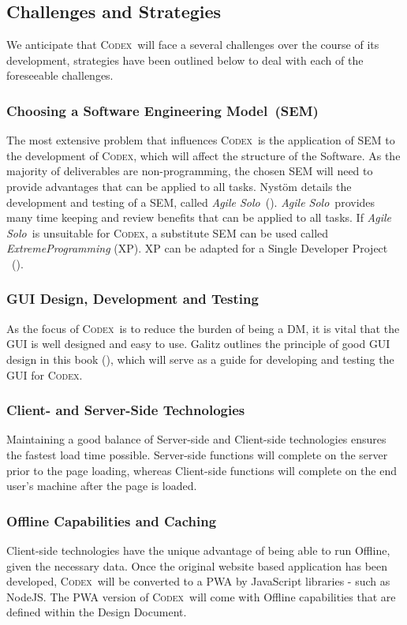 \documentclass[review]{cmpreport}
\newcommand{\sem}{Software Engineering Model}
\newcommand{\Codex}{\textsc{Codex}}
\newcommand{\AgileSolo}{\emph{Agile Solo}}
\begin{document}
	\subsection{Challenges and Strategies}
	We anticipate that \Codex \ will face a several challenges over the course of its development, strategies have been outlined below to deal with each of the foreseeable challenges.	

	\subsubsection{Choosing a \sem \ (SEM)} 
	The most extensive problem that influences \Codex \ is the application of SEM to the development of \Codex, which will affect the structure of the Software. As the majority of deliverables are non-programming, the chosen SEM will need to provide advantages that can be applied to all tasks. Nyst{\"o}m details the development and testing of a SEM, called \AgileSolo \ (\cite{AgileSolo}). \AgileSolo \ provides many time keeping and review benefits that can be applied to all tasks. If \AgileSolo \ is unsuitable for \Codex, a substitute SEM can be used called \emph{ExtremeProgramming} (XP). XP can be adapted for a Single Developer Project \ (\cite{SoloXP}).
	
	\subsubsection{GUI Design, Development and Testing}
	As the focus of \Codex \ is to reduce the burden of being a DM, it is vital that the GUI is well designed and easy to use. Galitz outlines the principle of good GUI design in this book (\cite{GUIDesign}), which will serve as a guide for developing and testing the GUI for \Codex.
	
	\subsubsection{Client- and Server-Side Technologies}
	Maintaining a good balance of Server-side and Client-side technologies ensures the fastest load time possible. Server-side functions will complete on the server prior to the page loading, whereas Client-side functions will complete on the end user's machine after the page is loaded.
	
	\subsubsection{Offline Capabilities and Caching}
	Client-side technologies have the unique advantage of being able to run Offline, given the necessary data. Once the original website based application has been developed, \Codex \ will be converted to a PWA by JavaScript libraries - such as NodeJS. The PWA version of \Codex \ will come with Offline capabilities that are defined within the Design Document.
	
\end{document}
